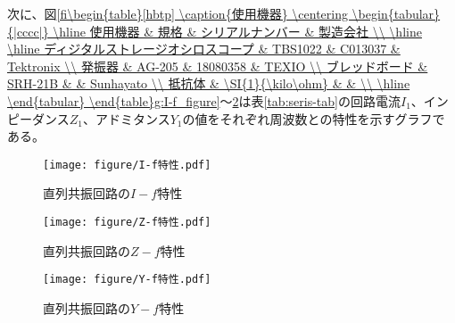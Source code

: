 \documentclass[12pt,a4paper]{jsarticle}
\numberwithin{equation}{section}
\numberwithin{figure}{section}
\numberwithin{table}{section}
\begin{document}
      次に、図\ref{fi\begin{table}[hbtp]
        \caption{使用機器}
        \centering
          \begin{tabular}{|cccc|}
            \hline
                         使用機器               &       規格         &  シリアルナンバー &   製造会社   \\
            \hline 
            \hline
            ディジタルストレージオシロスコープ   &     TBS1022       &      C013037      &  Tektronix    \\
                         発振器                 &     AG-205        &     18080358      &   TEXIO        \\
                      ブレッドボード            &     SRH-21B       &                   &  Sunhayato     \\
                         抵抗体                 & \SI{1}{\kilo\ohm} &                   &                \\
            \hline  
          \end{tabular}
      \end{table}g:I-f_figure}～\ref{fig:Y-f_figure}は表\ref{tab:seris-tab}の回路電流$I_1$、インピーダンス$Z_1$、アドミタンス$Y_1$の値をそれぞれ周波数との特性を示すグラフである。
      \begin{figure}[H]
        \begin{minipage}[H]{0.5\linewidth}   
          \centering
            \texttt{[image: figure/I-f特性.pdf]}
            \caption{直列共振回路の$I-f$特性}\label{fig:I-f_figure}
        \end{minipage}
        \begin{minipage}[H]{0.5\linewidth}          
          \centering
            \texttt{[image: figure/Z-f特性.pdf]}
            \caption{直列共振回路の$Z-f$特性}\label{fig:Z-f_figure}
        \end{minipage}
      \end{figure}
      \begin{figure}[H]
        \centering
          \texttt{[image: figure/Y-f特性.pdf]}
          \caption{直列共振回路の$Y-f$特性}\label{fig:Y-f_figure}
      \end{figure}
\end{document}
